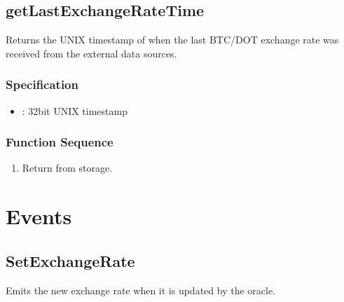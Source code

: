 \documentclass[a4paper,10pt,english]{sphinxmanual}
\begin{document}
\subsection{getLastExchangeRateTime}
\label{\detokenize{spec/oracle:getlastexchangeratetime}}\label{\detokenize{spec/oracle:id8}}
Returns the UNIX timestamp of when the last BTC/DOT exchange rate was received from the external data sources.


\subsubsection{Specification}
\label{\detokenize{spec/oracle:id9}}


\begin{itemize}
\item {} 
: 32bit UNIX timestamp

\end{itemize}



\subsubsection{Function Sequence}
\label{\detokenize{spec/oracle:id10}}\begin{enumerate}
%
\item {} 
Return  from storage.

\end{enumerate}


\section{Events}
\label{\detokenize{spec/oracle:events}}

\subsection{SetExchangeRate}
\label{\detokenize{spec/oracle:id11}}
Emits the new exchange rate when it is updated by the oracle.


\end{document}

